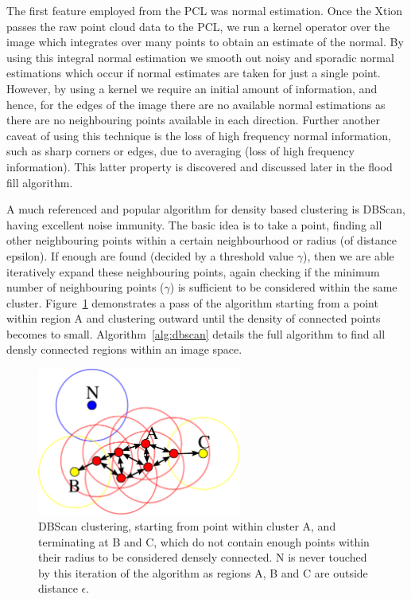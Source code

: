 \documentclass[]{article}
\begin{document}
{The first feature employed from the \ac{PCL} was normal estimation. Once the Xtion passes the raw point cloud data to the \ac{PCL}, we run a kernel operator over the image which integrates over many points to obtain an estimate of the normal. By using this integral normal estimation we smooth out noisy and sporadic normal estimations which occur if normal estimates are taken for just a single point. However, by using a kernel we require an initial amount of information, and hence, for the edges of the image there are no available normal estimations as there are no neighbouring points available in each direction. Further another caveat of using this technique is the loss of high frequency normal information, such as sharp corners or edges, due to averaging (loss of high frequency information). This latter property is discovered and discussed later in the flood fill algorithm. 

A much referenced and popular algorithm for density based clustering is \ac{DBScan}, having excellent noise immunity. The basic idea is to take a point, finding all other neighbouring points within a certain neighbourhood or radius (of distance epsilon). If enough are found (decided by a threshold value $\gamma$), then we are able iteratively expand these neighbouring points, again checking if the minimum number of neighbouring points ($\gamma$) is sufficient to be considered within the same cluster. Figure~\ref{fig:dbscan} demonstrates a pass of the algorithm starting from a point within region A and clustering outward until the density of connected points becomes to small. Algorithm~\ref{alg:dbscan} details the full algorithm to find all densly connected regions within an image space.

\begin{figure}[bt]
	\begin{center}
		\includegraphics[width=0.6\textwidth]{2000px-DBSCAN-Illustration.png}
	\end{center}
	\caption{\ac{DBScan} clustering, starting from point within cluster A, and terminating at B and C, which do not contain enough points within their radius to be considered densely connected. N is never touched by this iteration of the algorithm as regions A, B and C are outside distance $\epsilon$.}
	\label{fig:dbscan}
	

\end{figure}}
\end{document}
